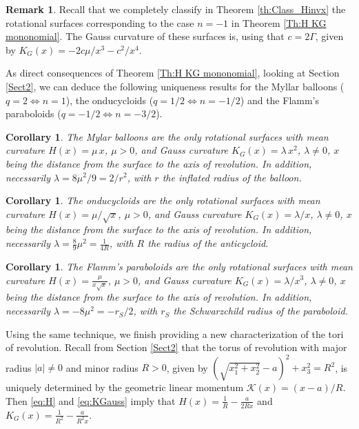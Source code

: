 \documentclass[leqno,11pt]{amsart}
\newtheorem{corollary}[theorem]{Corollary}
\theoremstyle{definition}
\newtheorem{remark}[theorem]{Remark}
\numberwithin{equation}{section}
\begin{document}
\begin{remark}
Recall that we completely classify in Theorem \ref{th:Class_Hinvx} the rotational surfaces corresponding to the case $n=-1$	in Theorem \ref{Th:H KG mononomial}.  The Gauss curvature of these surfaces is, using that $c=2\Gamma$,  given by 
$
K_G(x) = - 2c \mu/ x^3 -c^2/x^4. 
$
\end{remark}

As direct consequences of Theorem \ref{Th:H KG mononomial}, looking at Section \ref{Sect2}, we can deduce the following uniqueness results for the Myllar balloons ($q=2 \Leftrightarrow n=1$), the onducycloids ($q=1/2 \Leftrightarrow n=-1/2$) and the Flamm's paraboloids ($q=-1/2 \Leftrightarrow n=-3/2$).

\begin{corollary}\label{cor:Mylar}
	The Mylar balloons are the only rotational surfaces with mean curvature $H(x)=\mu \, x$, $\mu >0$,
	and Gauss curvature $K_G (x)=\lambda \, x^2$, $\lambda \neq 0$, $x$ being the distance from the surface to the axis of revolution. In addition, necessarily $\lambda=8 \mu^2/9= 2/r^2$, with $r$ the inflated radius of the balloon.
\end{corollary}

\begin{corollary}\label{cor:Onducycloids}
	The onducycloids are the only rotational surfaces with mean curvature $H(x)=\mu /\sqrt  x$, $\mu >0$,
	and Gauss curvature $K_G (x)=\lambda / x$, $\lambda \neq 0$, $x$ being the distance from the surface to the axis of revolution. In addition, necessarily $\lambda=\frac89 \mu^2= \frac{1}{4R}$, with $R$ the radius of the anticycloid.
\end{corollary}

\begin{corollary}\label{cor:Flamm paraboloids}
	The Flamm's paraboloids are the only rotational surfaces with mean curvature $H(x)=\frac{\mu}{x\sqrt  x}$, $\mu >0$,
	and Gauss curvature $K_G (x)=\lambda / x^3$, $\lambda \neq 0$, $x$ being the distance from the surface to the axis of revolution. In addition, necessarily $\lambda=-8 \mu^2= -r_S /2$, with $r_S$ the Schwarzchild radius of the paraboloid.
\end{corollary}

Using the same technique, we finish providing a new characterization of the tori of revolution.
Recall from Section \ref{Sect2} that the torus of revolution with major radius $|a|\neq 0$ and minor radius $R>0$, given by $(\sqrt{x_1^2+x_2^2}-a)^2+x_3^2=R^2$, is uniquely determined by the geometric linear momentum  $\mathcal K (x)=(x-a)/R$.
Then \eqref{eq:H} and \eqref{eq:KGauss} imply that
$H(x)=\frac{1}{R}-\frac{a}{2Rx}$ and $K_G(x)=\frac{1}{R^2}-\frac{a}{R^2x}$.
\end{document}
